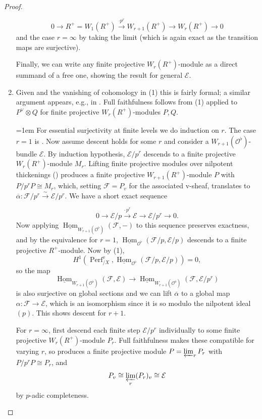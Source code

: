 \documentclass[10pt,twoside]{article}
\numberwithin{equation}{section}
\theoremstyle{plain}
\theoremstyle{definition}
\DeclareMathOperator{\Hom}{Hom}
\DeclareMathOperator{\Perf}{Perf}
\newcommand{\MCE}{\mathcal{E}}
\newcommand{\MCF}{\mathcal{F}}
\newcommand{\MCO}{\mathcal{O}}
\begin{document}
\begin{proof}
\begin{enumerate}
    \[0\longrightarrow R^+=W_1(R^+)\xrightarrow{\cdot p^r} W_{r+1}(R^+) \longrightarrow W_r(R^+)\longrightarrow 0\]
    and the case \(r=\infty\) by taking the limit (which is again exact as the transition maps are surjective).\par
    Finally, we can write any finite projective \(W_r(R^+)\)-module as a direct summand of a free one, showing the result for general \(\MCE\).
    \item Given  and the vanishing of cohomology in (1) this is fairly formal; a similar argument appears, e.g., in \cite[Theorem 4.1]{projectivity}. Full faithfulness follows from (1) applied to \(P^\vee\otimes Q\) for finite projective \(W_r(R^+)\)-modules \(P,Q\).\par
{\emergencystretch=1em For essential surjectivity at finite levels we do induction on \(r\). The case \(r=1\) is . Now assume descent holds for some \(r\) and consider a \(W_{r+1}(\MCO^\flat)\)-bundle \(\MCE\). By induction hypothesis, \(\MCE/p^r\) descends to a finite projective \(W_r(R^+)\)-module \(M_r\). Lifting finite projective modules over nilpotent thickenings (\cite[0D4A]{Stacks}) produces a finite projective \(W_{r+1}(R^+)\)-module \(P\) with \(P/p^rP\cong M_r\), which, setting \(\MCF=P_v\) for the associated v-sheaf, translates to \(\overline\alpha:\MCF/p^r\xrightarrow{\sim}\MCE/p^r\). We have a short exact sequence\par}
    \[0\longrightarrow \MCE/p\xrightarrow{\cdot\, p^r} \MCE\longrightarrow \MCE/p^r\longrightarrow 0.\]
    Now applying \(\underline{\Hom}_{W_{r+1}(\MCO^\flat)}(\MCF,-)\) to this sequence preserves exactness, and by the equivalence for \(r=1\), \(\underline{\Hom}_{\MCO^\flat}(\MCF/p,\MCE/p)\) descends to a finite projective \(R^+\)-module. Now by (1), 
\[H^1(\Perf^v_{/X},\underline{\Hom}_{\MCO^\flat}(\MCF/p,\MCE/p))=0,\]
so the map
\[\underline{\Hom}_{W_{r+1}(\MCO^\flat)}(\MCF,\MCE) \longrightarrow \underline{\Hom}_{W_{r+1}(\MCO^\flat)}(\MCF,\MCE/p^r)\]
is also surjective on global sections and we can lift \(\overline\alpha\) to a global map \(\alpha:\MCF\to\MCE\), which is an isomorphism since it is so modulo the nilpotent ideal \((p)\). This shows descent for \(r+1\).\par
 For \(r=\infty\), first descend each finite step \(\MCE/p^r\) individually to some finite projective \(W_r(R^+)\)-module \(P_r\). Full faithfulness makes these compatible for varying \(r\), so \cite[0D4B]{Stacks} produces a finite projective module \(P=\varprojlim_rP_r\) with \(P/p^rP\cong P_r\), and 
\[P_v\cong\varprojlim_r(P_r)_v\cong\MCE\]
by \(p\)-adic completeness.
\end{enumerate}
\end{proof}
\end{document}

